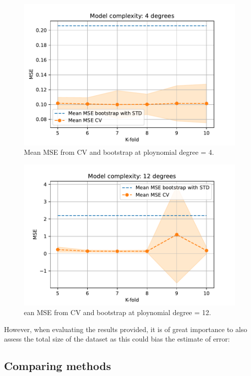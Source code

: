 \documentclass[11pt, a4paper]{article}
\begin{document}
\begin{figure}[h]
  \centering
  \includegraphics[scale=0.75]{figures/EX3_mse_cv_boot4.pdf}
  \caption{\label{fig:?} Mean MSE from CV and bootstrap at ploynomial degree = 4.}
\end{figure}



\begin{figure}[h]
  \centering
  \includegraphics[scale=0.75]{figures/EX3_mse_cv_boot12.pdf}
  \caption{\label{fig:?}ean MSE from CV and bootstrap at ploynomial degree = 12.}
\end{figure}


However, when evaluating the results provided, it is of great importance to also assess the total size of the dataset as this could bias the estimate of error:

\subsection*{Comparing methods}
\end{document}
